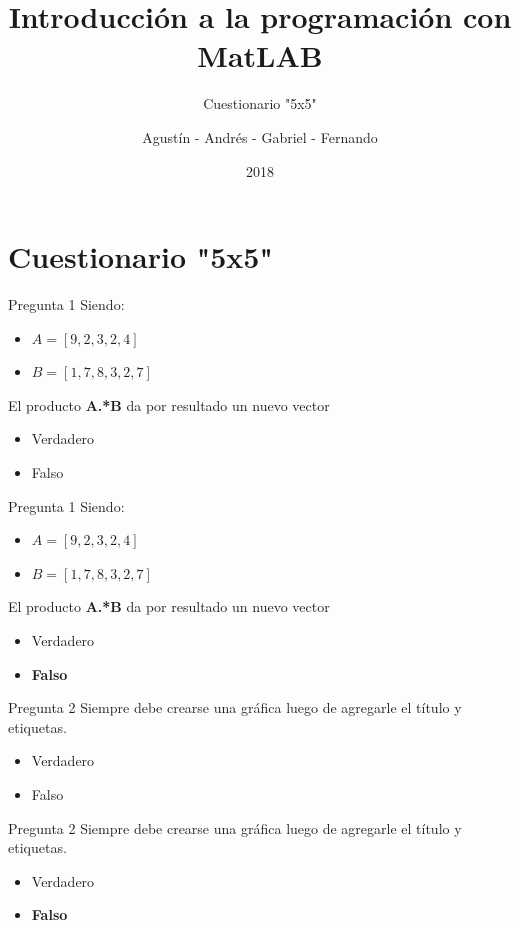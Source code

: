 \documentclass{bredelebeamer}
\title[Programación en MatLAB]{Introducción a la programación con MatLAB}
\subtitle{Cuestionario "5x5"}
\author{Agustín - Andrés - Gabriel - Fernando\inst{1}}
\institute[UTN.BA]
{
  \inst{1}%
  Universidad Tecnológica Nacional\\
  Facultad Regional Buenos Aires
  }
\date{2018}
\begin{document}
\begin{frame}
  \titlepage 
\end{frame}




\section{Cuestionario "5x5"}

\begin{frame}{Pregunta 1}
Siendo:
\begin{itemize}
\item $A = [9, 2, 3, 2, 4]$
\item $B = [1, 7, 8, 3, 2,7]$
\end{itemize}
El producto \textbf{A.*B} da por resultado un nuevo vector
\begin{itemize}
\item Verdadero
\item Falso
\end{itemize}
\end{frame}

\begin{frame}{Pregunta 1}
Siendo:
\begin{itemize}
\item $A = [9, 2, 3, 2, 4]$
\item $B = [1, 7, 8, 3, 2,7]$
\end{itemize}
El producto \textbf{A.*B} da por resultado un nuevo vector
\begin{itemize}
\item Verdadero
\item \textbf{Falso}
\end{itemize}
\end{frame}

\begin{frame}{Pregunta 2}
Siempre debe crearse una gráfica luego de agregarle el título y etiquetas. 
\begin{itemize}
\item Verdadero
\item Falso
\end{itemize}
\end{frame}

\begin{frame}{Pregunta 2}
Siempre debe crearse una gráfica luego de agregarle el título y etiquetas. 
\begin{itemize}
\item Verdadero
\item \textbf{Falso}
\end{itemize}
\end{frame}
\end{document}
